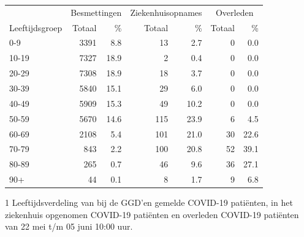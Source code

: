 \documentclass[
  english,
  man,floatsintext]{apa6}
\begin{document}
\begin{table}
\centering\begingroup\fontsize{11}{13}\selectfont

\begin{threeparttable}
\begin{tabular}{lrrrrrr}
\toprule
\multicolumn{1}{c}{ } & \multicolumn{2}{c}{Besmettingen} & \multicolumn{2}{c}{Ziekenhuisopnames} & \multicolumn{2}{c}{Overleden} \\
\cmidrule(l{3pt}r{3pt}){2-3} \cmidrule(l{3pt}r{3pt}){4-5} \cmidrule(l{3pt}r{3pt}){6-7}
Leeftijdsgroep & Totaal & \% & Totaal & \% & Totaal & \%\\
\midrule
0-9 & 3391 & 8.8 & 13 & 2.7 & 0 & 0.0\\
10-19 & 7327 & 18.9 & 2 & 0.4 & 0 & 0.0\\
20-29 & 7308 & 18.9 & 18 & 3.7 & 0 & 0.0\\
30-39 & 5840 & 15.1 & 29 & 6.0 & 0 & 0.0\\
40-49 & 5909 & 15.3 & 49 & 10.2 & 0 & 0.0\\
50-59 & 5670 & 14.6 & 115 & 23.9 & 6 & 4.5\\
60-69 & 2108 & 5.4 & 101 & 21.0 & 30 & 22.6\\
70-79 & 843 & 2.2 & 100 & 20.8 & 52 & 39.1\\
80-89 & 265 & 0.7 & 46 & 9.6 & 36 & 27.1\\
90+ & 44 & 0.1 & 8 & 1.7 & 9 & 6.8\\
\bottomrule
\end{tabular}
\begin{tablenotes}
\item[1] Leeftijdsverdeling van bij de GGD’en gemelde COVID-19 patiënten, in het ziekenhuis opgenomen COVID-19 patiënten en overleden COVID-19 patiënten van 22 mei t/m 05 juni 10:00 uur.
\end{tablenotes}
\end{threeparttable}
\endgroup{}
\end{table}

\newpage
\end{document}
